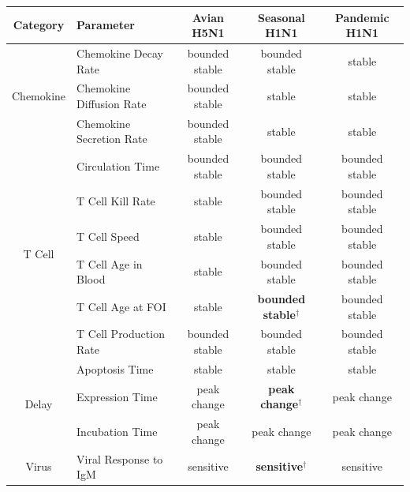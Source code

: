 \documentclass[preprint,10pt,authoryear]{elsarticle}
\begin{document}
\begin{table}[!ht]
\begin{center}
\begin{tabular}{| c | l | c c c |}
  \hline                        
  Category & Parameter & Avian H5N1 & Seasonal H1N1 & Pandemic H1N1 \\
  \hline
  \multirow{3}{*}{Chemokine} & Chemokine Decay Rate & \cellcolor{blue!30}bounded stable & \cellcolor{blue!30}bounded stable & \cellcolor{green!50}stable \\
  & Chemokine Diffusion Rate & \cellcolor{blue!30}bounded stable & \cellcolor{green!50}stable& \cellcolor{green!50}stable \\
  & Chemokine Secretion Rate & \cellcolor{blue!30}bounded stable & \cellcolor{green!50}stable & \cellcolor{green!50}stable \\
  \hline
  \multirow{6}{*}{T Cell} & Circulation Time & \cellcolor{blue!30}bounded stable & \cellcolor{blue!30}bounded stable & \cellcolor{blue!30}bounded stable \\
  & T Cell Kill Rate & \cellcolor{green!50}stable & \cellcolor{blue!30}bounded stable & \cellcolor{blue!30}bounded stable \\
  & T Cell Speed & \cellcolor{green!50}stable & \cellcolor{blue!30}bounded stable & \cellcolor{blue!30}bounded stable \\
  & T Cell Age in Blood & \cellcolor{green!50}stable & \cellcolor{blue!30}bounded stable& \cellcolor{blue!30}bounded stable \\
  & T Cell Age at FOI & \cellcolor{green!50}stable & \cellcolor{blue!30}\textbf{bounded stable$^\dagger$} & \cellcolor{blue!30}bounded stable \\
  & T Cell Production Rate & \cellcolor{blue!30}bounded stable & \cellcolor{blue!30}bounded stable & \cellcolor{blue!30}bounded stable \\
  \hline
  \multirow{3}{*}{Delay} & Apoptosis Time & \cellcolor{green!50}stable & \cellcolor{green!50}stable & \cellcolor{green!50}stable \\
  & Expression Time & \cellcolor{yellow!50}peak change & \cellcolor{yellow!50}\textbf{peak change$^\dagger$} & \cellcolor{yellow!50}peak change \\
  & Incubation Time &  \cellcolor{yellow!50}peak change & \cellcolor{yellow!50}peak change & \cellcolor{yellow!50}peak change \\
  \hline 
  \multirow{4}{*}{Virus} & Viral Response to IgM & \cellcolor{red!40}sensitive & \cellcolor{red!40}\textbf{sensitive$^\dagger$} & \cellcolor{red!40}sensitive \\

\end{tabular}
\end{center}
\end{table}
\end{document}
